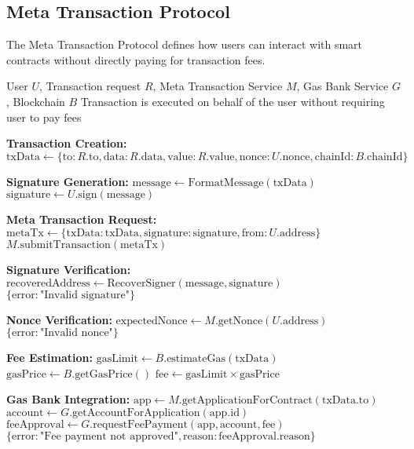 \subsection{Meta Transaction Protocol}
\label{subsec:meta-tx-protocol}

The Meta Transaction Protocol defines how users can interact with smart contracts without directly paying for transaction fees.

\begin{protocol}
\label{prot:meta-tx-processing}
\begin{algorithmic}[1]
\Require User $U$, Transaction request $R$, Meta Transaction Service $M$, Gas Bank Service $G$, Blockchain $B$
\Ensure Transaction is executed on behalf of the user without requiring user to pay fees

\State \textbf{Transaction Creation:}
\State $\text{txData} \gets \{\text{to}: R.\text{to}, \text{data}: R.\text{data}, \text{value}: R.\text{value}, \text{nonce}: U.\text{nonce}, \text{chainId}: B.\text{chainId}\}$

\State \textbf{Signature Generation:}
\State $\text{message} \gets \text{FormatMessage}(\text{txData})$
\State $\text{signature} \gets U.\text{sign}(\text{message})$

\State \textbf{Meta Transaction Request:}
\State $\text{metaTx} \gets \{\text{txData}: \text{txData}, \text{signature}: \text{signature}, \text{from}: U.\text{address}\}$
\State $M.\text{submitTransaction}(\text{metaTx})$

\State \textbf{Signature Verification:}
\State $\text{recoveredAddress} \gets \text{RecoverSigner}(\text{message}, \text{signature})$
    \State \Return $\{\text{error}: \text{"Invalid signature"}\}$
\EndIf

\State \textbf{Nonce Verification:}
\State $\text{expectedNonce} \gets M.\text{getNonce}(U.\text{address})$
    \State \Return $\{\text{error}: \text{"Invalid nonce"}\}$
\EndIf

\State \textbf{Fee Estimation:}
\State $\text{gasLimit} \gets B.\text{estimateGas}(\text{txData})$
\State $\text{gasPrice} \gets B.\text{getGasPrice}()$
\State $\text{fee} \gets \text{gasLimit} \times \text{gasPrice}$

\State \textbf{Gas Bank Integration:}
\State $\text{app} \gets M.\text{getApplicationForContract}(\text{txData}.\text{to})$
\State $\text{account} \gets G.\text{getAccountForApplication}(\text{app}.\text{id})$
\State $\text{feeApproval} \gets G.\text{requestFeePayment}(\text{app}, \text{account}, \text{fee})$
    \State \Return $\{\text{error}: \text{"Fee payment not approved"}, \text{reason}: \text{feeApproval}.\text{reason}\}$
\EndIf


\end{algorithmic}
\end{protocol}

